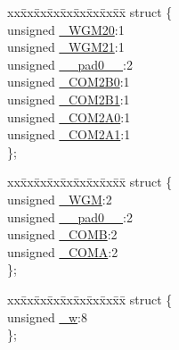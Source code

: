 \begin{DoxyCompactItemize}
\item 
\begin{tabbing}
xx\=xx\=xx\=xx\=xx\=xx\=xx\=xx\=xx\=\kill
struct \{\\
\>unsigned \hyperlink{union_____t_c_c_r2_abits__t_ad4d45207e6874e64535216c7a9fcb48d}{\_WGM20}:1\\
\>unsigned \hyperlink{union_____t_c_c_r2_abits__t_a4933d1927e310fddcaea049b436fe836}{\_WGM21}:1\\
\>unsigned \hyperlink{union_____t_c_c_r2_abits__t_ad98298ba63b491ea882b3eca119453cb}{\_\_pad0\_\_}:2\\
\>unsigned \hyperlink{union_____t_c_c_r2_abits__t_aa8802d30ff7fa18df0c556ca6317ffb6}{\_COM2B0}:1\\
\>unsigned \hyperlink{union_____t_c_c_r2_abits__t_a447a54e396b31ef549d61fa455fa5f27}{\_COM2B1}:1\\
\>unsigned \hyperlink{union_____t_c_c_r2_abits__t_ae37a5cba4e57d55d38b6ea71d226875e}{\_COM2A0}:1\\
\>unsigned \hyperlink{union_____t_c_c_r2_abits__t_a30c18c763e63ba9324e09a3008a3040d}{\_COM2A1}:1\\
\}; \\

\end{tabbing}\item 
\begin{tabbing}
xx\=xx\=xx\=xx\=xx\=xx\=xx\=xx\=xx\=\kill
struct \{\\
\>unsigned \hyperlink{union_____t_c_c_r2_abits__t_af1852fd2a4db292d8eca8eaf7351b79b}{\_WGM}:2\\
\>unsigned \hyperlink{union_____t_c_c_r2_abits__t_ad98298ba63b491ea882b3eca119453cb}{\_\_pad0\_\_}:2\\
\>unsigned \hyperlink{union_____t_c_c_r2_abits__t_add7f138674f8aa786f819b57210ae40f}{\_COMB}:2\\
\>unsigned \hyperlink{union_____t_c_c_r2_abits__t_abe4bbf00c5f9be6c72676841a7561886}{\_COMA}:2\\
\}; \\

\end{tabbing}\item 
\begin{tabbing}
xx\=xx\=xx\=xx\=xx\=xx\=xx\=xx\=xx\=\kill
struct \{\\
\>unsigned \hyperlink{union_____t_c_c_r2_abits__t_a1b770b0c1428ed5fd5fe787110313a0f}{\_w}:8\\
\}; \\

\end{tabbing}\end{DoxyCompactItemize}


